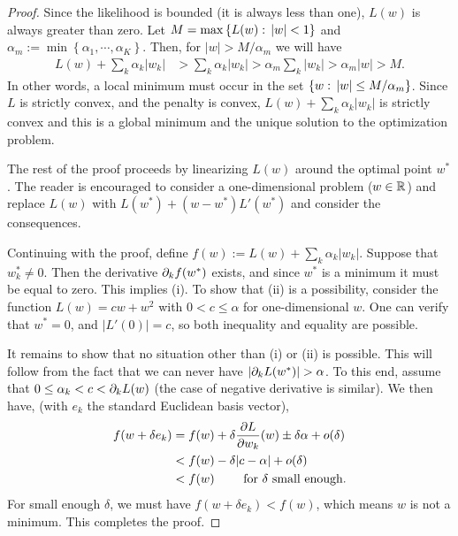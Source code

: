 \begin{proof}
  Since the likelihood is bounded (it is always less than one), $L(w)$ is always greater than zero.  Let $M = \max\left\{ L(w):\, |w|<1 \right\}$ and $\alpha_m:=\min\left\{ \alpha_1,\cdots,\alpha_K \right\}$.  Then, for $|w|>M/\alpha_m$ we will have 
  \begin{align*}
    L(w) + \sum_k\alpha_k|w_k| & > \sum_k\alpha_k|w_k| > \alpha_m\sum_k|w_k| > \alpha_m|w| > M.
  \end{align*}
  In other words, a local minimum must occur in the set $\left\{ w:\, |w| \leq M/\alpha_m \right\}$.  Since $L$ is strictly convex, and the penalty is convex, $L(w) + \sum_k\alpha_k|w_k|$ is strictly convex and this is a global minimum and the unique solution to the optimization problem.

  The rest of the proof proceeds by linearizing $L(w)$ around the optimal point $w^\ast$.  The reader is encouraged to consider a one-dimensional problem ($w\in{\mathbb R}$) and replace $L(w)$ with $L(w^\ast) + (w-w^\ast)L'(w^\ast)$ and consider the consequences.

  Continuing with the proof, define $f(w) := L(w) + \sum_k\alpha_k|w_k|$.  Suppose that $w^\ast_k\neq0$.  Then the derivative $\partial_kf(w^\ast)$ exists, and since $w^\ast$ is a minimum it must be equal to zero.  This implies (i).  To show that (ii) is a possibility, consider the function $L(w) = cw + w^2$ with $0<c\leq\alpha$ for one-dimensional $w$.  One can verify that $w^\ast=0$, and $|L'(0)| = c$, so both inequality and equality are possible.  
  
It remains to show that no situation other than (i) or (ii) is possible.  This will follow from the fact that we can never have $|\partial_kL(w^\ast)| > \alpha$.  To this end, assume that $0\leq\alpha_k<c<\partial_kL(w)$ (the case of negative derivative is similar).  We then have, (with $e_k$ the standard Euclidean basis vector),
\begin{align*}
  f(w + \delta e_k) &= f(w) + \delta\frac{\partial L}{\partial w_k}(w) \pm\delta\alpha + o(\delta)\\
  &< f(w) - \delta|c-\alpha| + o(\delta)\\
  & < f(w) \qquad\mbox{ for $\delta$ small enough}.
\end{align*}
For small enough $\delta$, we must have $f(w + \delta e_k) < f(w)$, which means $w$ is not a minimum.  This completes the proof.
\end{proof}

